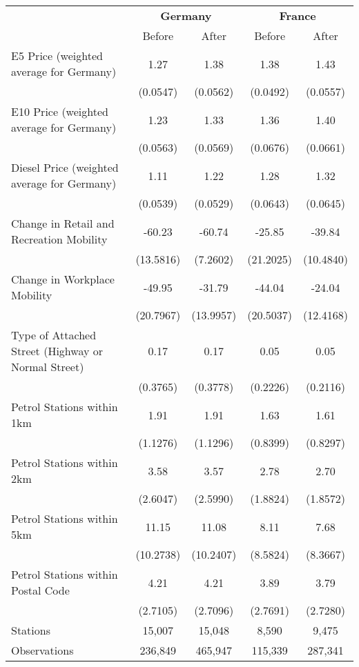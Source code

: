 \begin{tabular}{l*{4}{c}}
\toprule
                    &\multicolumn{2}{c}{\textbf{Germany}}&\multicolumn{2}{c}{\textbf{France}}\\\cmidrule(lr){2-3}\cmidrule(lr){4-5}
                    &\multicolumn{1}{c}{Before}&\multicolumn{1}{c}{After}&\multicolumn{1}{c}{Before}&\multicolumn{1}{c}{After}\\
\midrule
E5 Price (weighted average for Germany)&        1.27&        1.38&        1.38&        1.43\\
                    &    (0.0547)&    (0.0562)&    (0.0492)&    (0.0557)\\
E10 Price (weighted average for Germany)&        1.23&        1.33&        1.36&        1.40\\
                    &    (0.0563)&    (0.0569)&    (0.0676)&    (0.0661)\\
Diesel Price (weighted average for Germany)&        1.11&        1.22&        1.28&        1.32\\
                    &    (0.0539)&    (0.0529)&    (0.0643)&    (0.0645)\\
Change in Retail and Recreation Mobility&      -60.23&      -60.74&      -25.85&      -39.84\\
                    &   (13.5816)&    (7.2602)&   (21.2025)&   (10.4840)\\
Change in Workplace Mobility&      -49.95&      -31.79&      -44.04&      -24.04\\
                    &   (20.7967)&   (13.9957)&   (20.5037)&   (12.4168)\\
Type of Attached Street (Highway or Normal Street)&        0.17&        0.17&        0.05&        0.05\\
                    &    (0.3765)&    (0.3778)&    (0.2226)&    (0.2116)\\
Petrol Stations within 1km&        1.91&        1.91&        1.63&        1.61\\
                    &    (1.1276)&    (1.1296)&    (0.8399)&    (0.8297)\\
Petrol Stations within 2km&        3.58&        3.57&        2.78&        2.70\\
                    &    (2.6047)&    (2.5990)&    (1.8824)&    (1.8572)\\
Petrol Stations within 5km&       11.15&       11.08&        8.11&        7.68\\
                    &   (10.2738)&   (10.2407)&    (8.5824)&    (8.3667)\\
Petrol Stations within Postal Code&        4.21&        4.21&        3.89&        3.79\\
                    &    (2.7105)&    (2.7096)&    (2.7691)&    (2.7280)\\
\midrule
Stations            &      15,007&      15,048&       8,590&       9,475\\
Observations        &     236,849&     465,947&     115,339&     287,341\\
\bottomrule
\end{tabular}
